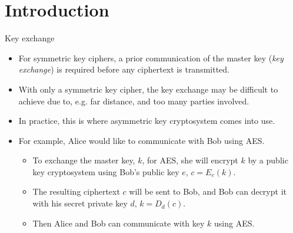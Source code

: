 \section{Introduction}
\begin{frame}{\VideoName}
    \tableofcontents[currentsection]
\end{frame}

\begin{frame}{Key exchange}
    \begin{itemize}
        \item For symmetric key ciphers, a prior communication of the master key (\textit{key exchange}) is required before any ciphertext is transmitted.
        \item With only a symmetric key cipher, the key exchange may be difficult to achieve due to, e.g. far distance, and too many parties involved.
        \item In practice, this is where asymmetric key cryptosystem comes into use.
        \item For example, Alice would like to communicate with Bob using AES.
        \begin{itemize}
            \item To exchange the master key, $k$, for AES, she will encrypt $k$ by a public key cryptosystem using Bob's public key $e$, $c=E_e(k)$.
            \item The resulting ciphertext $c$ will be sent to Bob, and Bob can decrypt it with his secret private key $d$, $k=D_d(c)$.
            \item Then Alice and Bob can communicate with key $k$ using AES.
        \end{itemize}
    \end{itemize}
\end{frame}


